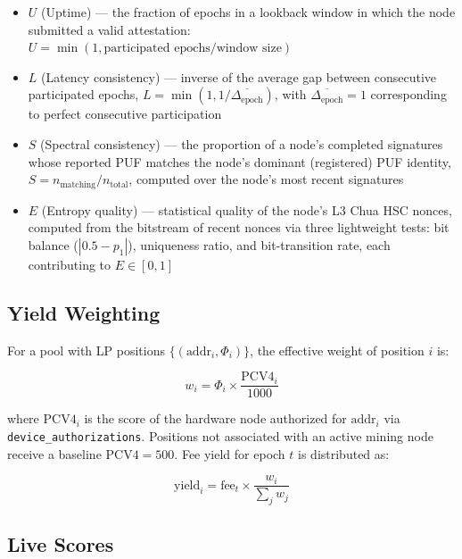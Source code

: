 \documentclass[11pt,a4paper]{article}
\begin{document}
\begin{itemize}
    \item $U$ (Uptime) --- the fraction of epochs in a lookback window in which the node submitted a valid attestation: $U = \min(1, \text{participated epochs} / \text{window size})$
    \item $L$ (Latency consistency) --- inverse of the average gap between consecutive participated epochs, $L = \min(1, 1/\overline{\Delta_{\text{epoch}}})$, with $\overline{\Delta_{\text{epoch}}} = 1$ corresponding to perfect consecutive participation
    \item $S$ (Spectral consistency) --- the proportion of a node's completed signatures whose reported PUF matches the node's dominant (registered) PUF identity, $S = n_{\text{matching}} / n_{\text{total}}$, computed over the node's most recent signatures
    \item $E$ (Entropy quality) --- statistical quality of the node's L3 Chua HSC nonces, computed from the bitstream of recent nonces via three lightweight tests: bit balance ($|0.5 - p_1|$), uniqueness ratio, and bit-transition rate, each contributing to $E \in [0,1]$
\end{itemize}

\subsection{Yield Weighting}

For a pool with LP positions $\{(\text{addr}_i, \Phi_i)\}$, the effective weight of position $i$ is:

\begin{equation}
    w_i = \Phi_i \times \frac{\text{PCV4}_i}{1000}
    \label{eq:weight}
\end{equation}

where $\text{PCV4}_i$ is the score of the hardware node authorized for $\text{addr}_i$ via \texttt{device\_authorizations}. Positions not associated with an active mining node receive a baseline $\text{PCV4} = 500$. Fee yield for epoch $t$ is distributed as:

\begin{equation}
    \text{yield}_i = \text{fee}_t \times \frac{w_i}{\sum_j w_j}
    \label{eq:yield}
\end{equation}

\subsection{Live Scores}
\end{document}
